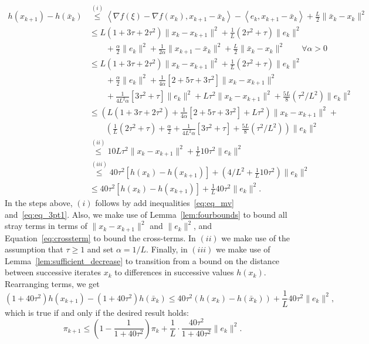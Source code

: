 \begin{align*}
h(x_{k+1})-h(\bar{x}_k)
&\overset{(i)}\leq\left\langle \nabla f(\xi)-\nabla f(x_{k}),x_{k+1}-\bar{x}_k\right\rangle -\left\langle e_{k},x_{k+1}-\bar{x}_k\right\rangle +\frac{L}{2}\|\bar{x}_k-x_{k}\|^{2}\\
 & \leq L(1+3\tau+2\tau^{2})\|x_{k}-x_{k+1}\|^{2}+\tfrac{1}{L}(2\tau^{2}+\tau)\|e_{k}\|^{2}\\
 & \qquad+\frac{\alpha}{2}\|e_{k}\|^{2}+\tfrac{1}{2\alpha}\|x_{k+1}-\bar{x}_k\|^{2}+\frac{L}{2}\|\bar{x}_k-x_{k}\|^{2} \qquad \forall \alpha >0\\
 & \leq L(1+3\tau+2\tau^{2})\|x_{k}-x_{k+1}\|^{2}+\tfrac{1}{L}(2\tau^{2}+\tau)\|e_{k}\|^{2}\\
 & \qquad+\frac{\alpha}{2}\|e_{k}\|^{2}+\tfrac{1}{4\alpha}[2+5\tau+3\tau^{2}]\|x_{k}-x_{k+1}\|^{2}\\
 & \qquad +\tfrac{1}{4L^{2}\alpha}[3\tau^{2}+\tau]\|e_{k}\|^{2}+L\tau^{2}\|x_{k}-x_{k+1}\|^{2}+\tfrac{5L}{8}(\tau^{2}/L^{2})\|e_{k}\|^{2}\\
 & \leq\left(L(1+3\tau+2\tau^{2})+\tfrac{1}{4\alpha}[2+5\tau+3\tau^{2}]+L\tau^{2}\right)\|x_{k}-x_{k+1}\|^{2}+\\
 & \qquad\left(\tfrac{1}{L}(2\tau^{2}+\tau)+\frac{\alpha}{2}+\tfrac{1}{4L^{2}\alpha}[3\tau^{2}+\tau]+\tfrac{5L}{8}(\tau^{2}/L^{2})\right)\|e_{k}\|^{2}\\
 & \overset{(ii)}{\leq}10L\tau^{2}\|x_{k}-x_{k+1}\|^{2}+\tfrac{1}{L}10\tau^{2}\|e_{k}\|^{2}\\
 & \overset{(iii)}{\leq}40\tau^{2}[h(x_{k})-h(x_{k+1})]+(4/L^2+\tfrac{1}{L}10\tau^{2})\|e_{k}\|^{2}\\
  &\leq40\tau^{2}[h(x_{k})-h(x_{k+1})]+\tfrac{1}{L}40\tau^{2}\|e_{k}\|^{2}.
\end{align*}
In the steps above, $(i)$ follows by add inequalities~\eqref{eq:eq_mv}
and~\eqref{eq:eq_3pt1}. Also, we make use of
Lemma~\ref{lem:fourbounds} to bound all stray terms in terms of
$\|x_k-x_{k+1}\|^2$ and $\|e_k\|^2$, and Equation~\eqref{eq:crossterm}
to bound the cross-terms. In $(ii)$ we make use of the assumption that
$\tau\geq1$ and set $\alpha=1/L$. Finally, in $(iii)$ we make use of
Lemma~\ref{lem:sufficient_decrease} to transition from a bound on the
distance between successive iterates $x_k$ to differences in
successive values $h(x_k)$.  Rearranging terms, we get
\[
(1+40\tau^{2})h(x_{k+1})-(1+40\tau^{2})h(\bar{x}_k)\leq40\tau^{2}(h(x_{k})-h(\bar{x}_k))+\frac{1}{L}40\tau^{2}\|e_{k}\|^{2},
\]
which is true if and only if the desired result holds:
\[
\pi_{k+1}\leq\left(1-\frac{1}{1+40\tau^{2}}\right)\pi_{k}+\frac{1}{L}\cdot\frac{40\tau^{2}}{1+40\tau^{2}}\|e_{k}\|^{2}.
\]


